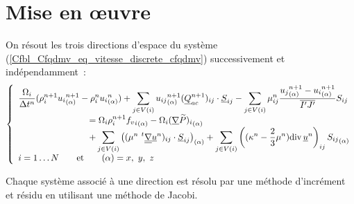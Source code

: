 \section*{Mise en \oe uvre}
On r\'esout les trois directions d'espace du syst\`eme
(\ref{Cfbl_Cfqdmv_eq_vitesse_discrete_cfqdmv}) successivement et ind\'ependamment~:
\begin{equation}\label{Cfbl_Cfqdmv_eq_vitesse_finale_cfqdmv}
\left\{\begin{array}{l}
\displaystyle\frac{\Omega_i}{\Delta t^n}
(\rho_i^{n+1}{u_i}_{(\alpha)}^{n+1}-\rho_i^n{u_i}_{(\alpha)}^n)
+ \displaystyle\sum\limits_{j\in V(i)}
{u_{ij}}_{(\alpha)}^{n+1}(\vect{Q}_{ac}^{n+1})_{ij}\cdot\vect{S}_{ij}
- \displaystyle\sum\limits_{j\in V(i)}
\mu_{ij}^n\frac{{u_j}_{(\alpha)}^{n+1}-{u_i}_{(\alpha)}^{n+1}}{\overline{I'J'}}S_{ij}\\
\qquad\qquad\qquad\qquad= \Omega_i\rho_i^{n+1} {{f_v}_i}_{(\alpha)}
- \Omega_i{(\gradv{\widetilde{P}})_{i}}_{(\alpha)}\\
\qquad\qquad\qquad\qquad + \displaystyle\sum\limits_{j\in V(i)}
\left((\mu^n\ ^t\gradt{\vect{u}^n})_{ij}\cdot\vect{S}_{ij}\right)_{(\alpha)}
 + \displaystyle\sum\limits_{j\in V(i)} \left((\kappa^n-\frac{2}{3}\mu^n)
\divs{\vect{u}^n}\right)_{ij}{S_{ij}}_{(\alpha)}\\
i = 1\ldots N \qquad \text{et} \qquad (\alpha) = x,\ y,\ z\\
\end{array}\right.
\end{equation}

Chaque syst\`eme associ\'e \`a une direction est r\'esolu par une m\'ethode
d'incr\'ement et r\'esidu en utilisant une m\'ethode de Jacobi.




